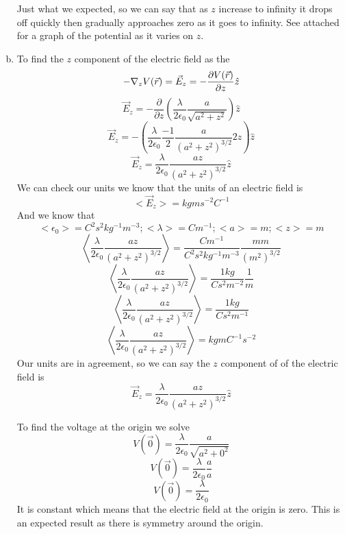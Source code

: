 \documentclass[11pt]{article}
\numberwithin{equation}{section}
\newcommand{\grad}{\bold\nabla}
\newcommand{\vecE}{\vec{E}}
\begin{document}
\begin{enumerate}[(a)]
Just what we expected, so we can say that as $z$ increase to infinity it drops off quickly then gradually approaches zero as it goes to infinity. See attached for a graph of the potential as it varies on $z$.
\item
To find the $z$ component of the electric field as the 
$$-\grad_z V(\vec{r})= \vecE_z = -\frac{\partial V(\vec{r})}{\partial z}\hat{z}$$
$$\vecE_z = -\frac{\partial}{\partial z}(\frac{\lambda}{2\epsilon_0}\frac{ a}{\sqrt{a^2 + z^2}})\hat{z}$$
$$\vecE_z = -\left(\frac{\lambda}{2\epsilon_0}\frac{-1}{2}\frac{a}{(a^2 + z^2)^{3/2}}2z\right)\hat{z}$$
$$\vecE_z = \frac{\lambda}{2\epsilon_0}\frac{az}{(a^2 + z^2)^{3/2}}\hat{z}$$
We can check our units we know that the units of an electric field is
$$<\vecE_z> = kg m s^{-2} C^{-1}$$
And we know that
$$<\epsilon_0> = C^2 s^2 kg^{-1} m^{-3}; <\lambda> = C m^{-1}; <a> = m; <z>=m$$
$$\left<\frac{\lambda}{2\epsilon_0}\frac{az}{(a^2 + z^2)^{3/2}}\right> = \frac{C m^{-1}}{C^2 s^2 kg^{-1} m^{-3}}\frac{mm}{(m^2)^{3/2}}$$
$$\left<\frac{\lambda}{2\epsilon_0}\frac{az}{(a^2 + z^2)^{3/2}}\right> = \frac{1kg}{C s^2 m^{-2}}\frac{1}{m}$$
$$\left<\frac{\lambda}{2\epsilon_0}\frac{az}{(a^2 + z^2)^{3/2}}\right> = \frac{1kg}{C s^2 m^{-1}}$$
$$\left<\frac{\lambda}{2\epsilon_0}\frac{az}{(a^2 + z^2)^{3/2}}\right> = kg m C^{-1} s^{-2} $$
Our units are in agreement, so we can say the $z$ component of of the electric field is
$$\vecE_z = \frac{\lambda}{2\epsilon_0}\frac{az}{(a^2 + z^2)^{3/2}}\hat{z}$$


To find the voltage at the origin we solve
$$V(\vec{0}) = \frac{\lambda}{2\epsilon_0}\frac{ a}{\sqrt{a^2 + 0^2}}$$
$$V(\vec{0}) = \frac{\lambda}{2\epsilon_0}\frac{ a}{a}$$
$$V(\vec{0}) = \frac{\lambda}{2\epsilon_0}$$
It is constant which means that the electric field at the origin is zero. This is an expected result as there is symmetry around the origin.
\end{enumerate}
\end{document}
